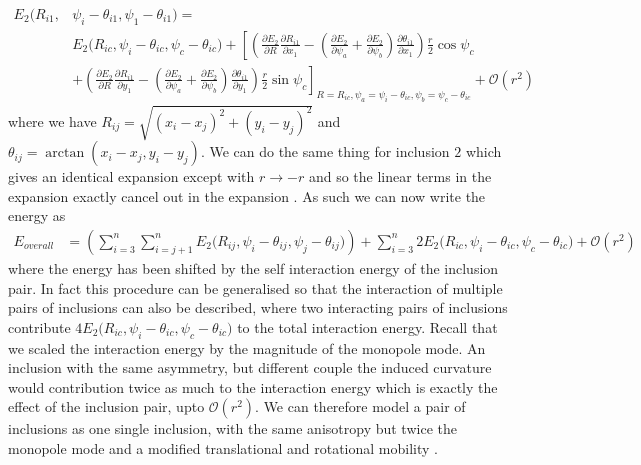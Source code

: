 \begin{equation}
\begin{split}
    E_{2}\big(R_{i1}, &\psi_i-\theta_{i1}, \psi_1-\theta_{i1}\big) = \\
    &E_{2}\big(R_{ic}, \psi_i-\theta_{ic}, \psi_c-\theta_{ic}\big) + \left[\left(\frac{\partial E_{2}}{\partial R}\frac{\partial R_{i1}}{\partial x_1}-\left(\frac{\partial E_{2}}{\partial \psi_a} + \frac{\partial E_{2}}{\partial \psi_b}\right)\frac{\partial \theta_{i1}}{\partial x_1}\right)\frac{r}{2}\cos\psi_{c}\right. \\
     &+ \left.\left(\frac{\partial E_{2}}{\partial R}\frac{\partial R_{i1}}{\partial y_1}-\left(\frac{\partial E_{2}}{\partial \psi_a} + \frac{\partial E_{2}}{\partial \psi_b}\right)\frac{\partial \theta_{i1}}{\partial y_1}\right)\frac{r}{2}\sin\psi_{c}\right]_{R=R_{ic}, \psi_a=\psi_i-\theta_{ic}, \psi_b=\psi_c-\theta_{ic}} + \mathcal{O}(r^2)
\end{split}
\end{equation}
where we have $R_{ij} = \sqrt{(x_i-x_j)^2+(y_i-y_j)^2}$ and $\theta_{ij}=\arctan(x_i-x_j, y_i-y_j)$. We can do the same thing for inclusion $2$ which gives an identical expansion except with $r\rightarrow-r$ and so the linear terms in the expansion exactly cancel out in the expansion . As such we can now write the energy as
\begin{equation}
\begin{split}
    E_{overall} &= \left(\sum_{i=3}^{n}\sum_{i=j+1}^{n}E_{2}\big(R_{ij}, \psi_i-\theta_{ij}, \psi_j-\theta_{ij}\big)\right) + \sum_{i=3}^{n}2E_{2}\big(R_{ic}, \psi_i-\theta_{ic}, \psi_c-\theta_{ic}\big) + \mathcal{O}(r^2)
\end{split}
\end{equation}
where the energy has been shifted by the self interaction energy of the inclusion pair. In fact this procedure can be generalised so that the interaction of multiple pairs of inclusions can also be described, where two interacting pairs of inclusions contribute $4 E_{2}\big(R_{ic}, \psi_i-\theta_{ic}, \psi_c-\theta_{ic}\big)$ to the total interaction energy. Recall that we scaled the interaction energy by the magnitude of the monopole mode. An inclusion with the same asymmetry, but different couple the induced curvature would contribution twice as much to the interaction energy which is exactly the effect of the inclusion pair, upto $\mathcal{O}(r^2)$. We can therefore model a pair of inclusions as one single inclusion, with the same anisotropy but twice the monopole mode and a modified translational and rotational mobility .

